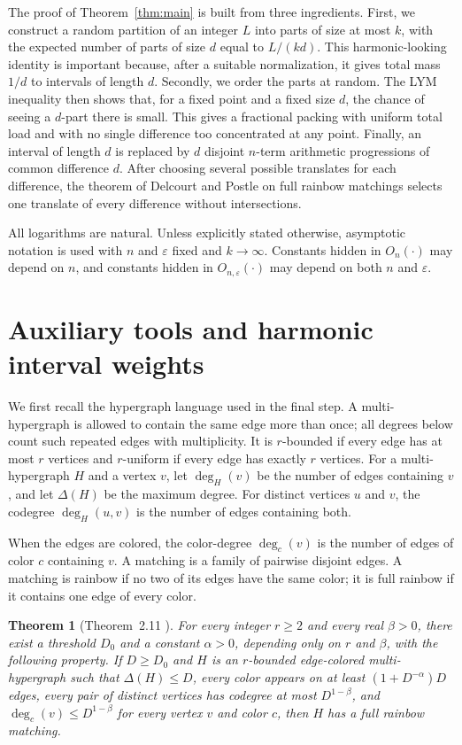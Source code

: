 \documentclass[twoside,12pt]{article}
\numberwithin{equation}{section}
\newtheorem{theorem}{Theorem}[section]
\newcommand{\eps}{\varepsilon}
\begin{document}
The proof of Theorem~\ref{thm:main} is built from three ingredients.  First, we
construct a random partition of an integer $L$ into parts of size at most $k$,
with the expected number of parts of size $d$ equal to $L/(kd)$.  This
harmonic-looking identity is important because, after a suitable normalization,
it gives total mass $1/d$ to intervals of length $d$.  Secondly, we order the
parts at random.  The LYM inequality then shows that, for a fixed point and a
fixed size $d$, the chance of seeing a $d$-part there is small.  This gives a
fractional packing with uniform total load and with no single difference too
concentrated at any point.  Finally, an interval of length $d$ is replaced by
$d$ disjoint $n$-term arithmetic progressions of common difference $d$.  After
choosing several possible translates for each difference, the theorem of
Delcourt and Postle on full rainbow matchings selects one translate of every
difference without intersections.

All logarithms are natural.  Unless explicitly stated otherwise, asymptotic
notation is used with $n$ and $\eps$ fixed and $k\to\infty$.  Constants hidden
in $O_n(\cdot)$ may depend on $n$, and constants hidden in
$O_{n,\eps}(\cdot)$ may depend on both $n$ and $\eps$.

\section{Auxiliary tools and harmonic interval weights}

We first recall the hypergraph language used in the final step.  A
multi-hypergraph is allowed to contain the same edge more than once; all
degrees below count such repeated edges with multiplicity.  It is
$r$-bounded if every edge has at most $r$ vertices and $r$-uniform if every
edge has exactly $r$ vertices.  For a multi-hypergraph $H$ and a vertex $v$,
let $\deg_H(v)$ be the number of edges containing $v$, and let $\Delta(H)$ be
the maximum degree.  For distinct vertices $u$ and $v$, the codegree
$\deg_H(u,v)$ is the number of edges containing both.

When the edges are colored, the color-degree $\deg_c(v)$ is the number of
edges of color $c$ containing $v$.  A matching is a family of pairwise disjoint
edges.  A matching is rainbow if no two of its edges have the same color; it is
full rainbow if it contains one edge of every color.

\begin{theorem}[Theorem~2.11 \cite{DP}]\label{thm:DP}
For every integer $r\ge2$ and every real $\beta>0$, there exist a threshold
$D_0$ and a constant $\alpha>0$, depending only on $r$ and $\beta$, with the
following property.  If $D\ge D_0$ and $H$ is an $r$-bounded edge-colored
multi-hypergraph such that $\Delta(H)\le D$, every color appears on at least
$(1+D^{-\alpha})D$ edges, every pair of distinct vertices has codegree at most
$D^{1-\beta}$, and $\deg_c(v)\le D^{1-\beta}$ for every vertex $v$ and color
$c$, then $H$ has a full rainbow matching.
\end{theorem}
\end{document}
